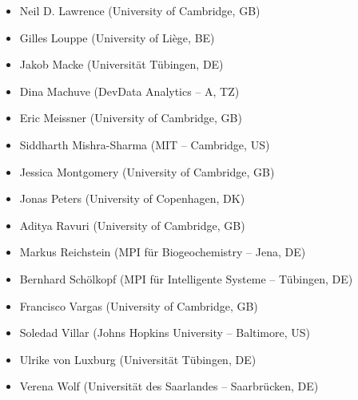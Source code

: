 \begin{itemize}
    \item
    Neil D. Lawrence (University of Cambridge, GB)
    \item
    Gilles Louppe (University of Liège, BE)
    \item
    Jakob Macke (Universität Tübingen, DE)
    \item
    Dina Machuve (DevData Analytics -- A, TZ)
    \item
    Eric Meissner (University of Cambridge, GB)
    \item
    Siddharth Mishra-Sharma (MIT -- Cambridge, US)
    \item
    Jessica Montgomery (University of Cambridge, GB)
    \item
    Jonas Peters (University of Copenhagen, DK)
    \item
    Aditya Ravuri (University of Cambridge, GB)
    \item
    Markus Reichstein (MPI für Biogeochemistry -- Jena, DE)
    \item
    Bernhard Schölkopf (MPI für Intelligente Systeme -- Tübingen, DE)
    \item
    Francisco Vargas (University of Cambridge, GB)
    \item
    Soledad Villar (Johns Hopkins University -- Baltimore, US)
    \item
    Ulrike von Luxburg (Universität Tübingen, DE)
    \item
    Verena Wolf (Universität des Saarlandes -- Saarbrücken, DE)

\end{itemize}